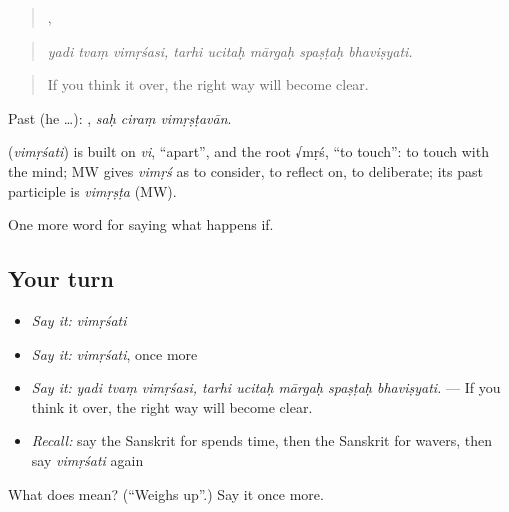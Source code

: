 \begin{quote}
  ,     
\end{quote}

\begin{quote}
\emph{yadi tvaṃ vimṛśasi, tarhi ucitaḥ mārgaḥ spaṣṭaḥ bhaviṣyati.}
\end{quote}

\begin{quote}
If you think it over, the right way will become clear.
\end{quote}

Past (he …):   , \emph{saḥ ciraṃ vimṛṣṭavān}.

\begin{cousinweb}
\textbf{} (\emph{vimṛśati}) is built on \emph{vi}, \textquotedblleft{}apart\textquotedblright{}, and the root √mṛś, \textquotedblleft{}to touch\textquotedblright{}: to touch with the mind; MW gives \emph{vimṛś} as to consider, to reflect on, to deliberate; its past participle is \emph{vimṛṣṭa} (MW).
\end{cousinweb}

\begin{grammarlens}[title={What you've built}]
One more word for saying what happens if.
\end{grammarlens}

\subsection*{Your turn}
\begin{itemize}
\raggedright
  \item \emph{Say it:} \emph{vimṛśati}
  \item \emph{Say it:} \emph{vimṛśati}, once more
  \item \emph{Say it:} \emph{yadi tvaṃ vimṛśasi, tarhi ucitaḥ mārgaḥ spaṣṭaḥ bhaviṣyati.} — If you think it over, the right way will become clear.
  \item \emph{Recall:} say the Sanskrit for spends time, then the Sanskrit for wavers, then say \emph{vimṛśati} again
\end{itemize}

\begin{tcolorbox}[breakable,colback=teal!4,colframe=teal!35!black,title={Before you move on}]
What does  mean? (\textquotedblleft{}Weighs up\textquotedblright{}.) Say it once more.
\end{tcolorbox}
